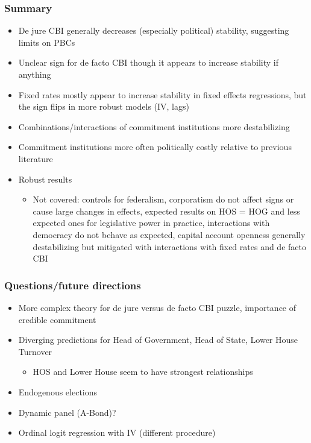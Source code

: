 \documentclass{beamer}
\begin{document}
    \begin{frame}
        \frametitle{Summary}
        \begin{itemize}
            \item De jure CBI generally decreases (especially political) stability, suggesting limits on PBCs
            \item Unclear sign for de facto CBI though it appears to increase stability if anything
            \item Fixed rates mostly appear to increase stability in fixed effects regressions, but the sign flips in more robust models (IV, lags)
            \item Combinations/interactions of commitment institutions more destabilizing
            \item Commitment institutions more often politically costly relative to previous literature
            \item Robust results
            \begin{itemize}
                \item Not covered: controls for federalism, corporatism do not affect signs or cause large changes in effects, expected results on HOS = HOG and less expected ones for legislative power in practice, interactions with democracy do not behave as expected, capital account openness generally destabilizing but mitigated with interactions with fixed rates and de facto CBI
            \end{itemize}
        \end{itemize}
    \end{frame}

    \begin{frame}
        \frametitle{Questions/future directions}
        \begin{itemize}
            \item More complex theory for de jure versus de facto CBI puzzle, importance of credible commitment
            \item Diverging predictions for Head of Government, Head of State, Lower House Turnover
            \begin{itemize}
                \item HOS and Lower House seem to have strongest relationships
            \end{itemize}
            \item Endogenous elections
            \item Dynamic panel (A-Bond)?
            \item Ordinal logit regression with IV (different procedure)
        \end{itemize}
    \end{frame}
\end{document}
